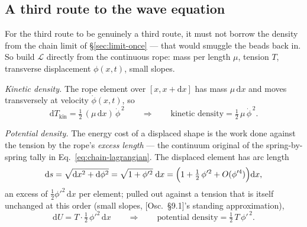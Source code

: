 \documentclass[11pt]{article}
\theoremstyle{plain}
\theoremstyle{definition}
\theoremstyle{remark}
\newcommand{\dd}{\mathrm{d}}
\begin{document}
\subsection{A third route to the wave equation}
\label{sec:wave-third-time}

For the third route to be genuinely a third route, it must not borrow
the density from the chain limit of \S\ref{sec:limit-once} --- that
would smuggle the beads back in. So build $\mathcal L$ directly from
the continuous rope: mass per length $\mu$, tension $T$, transverse
displacement $\phi(x, t)$, small slopes.

\emph{Kinetic density.} The rope element over $[x, x + \dd x]$ has
mass $\mu\,\dd x$ and moves transversely at velocity
$\dot\phi(x, t)$, so
\begin{equation}
  \dd T_{\text{kin}}
  = \tfrac12\,(\mu\,\dd x)\,\dot\phi^{\,2}
  \qquad\Longrightarrow\qquad
  \text{kinetic density} = \tfrac12\,\mu\,\dot\phi^{\,2} .
\end{equation}

\emph{Potential density.} The energy cost of a displaced shape is the
work done against the tension by the rope's \emph{excess length} ---
the continuum original of the spring-by-spring tally in
Eq.~\eqref{eq:chain-lagrangian}. The displaced element has arc length
\begin{equation}
  \dd s
  = \sqrt{\dd x^2 + \dd\phi^2}
  = \sqrt{1 + \phi'^2}\;\dd x
  = \Bigl(1 + \tfrac12\,\phi'^2 + O(\phi'^4)\Bigr)\dd x,
\end{equation}
an excess of $\tfrac12\phi'^2\,\dd x$ per element; pulled out against
a tension that is itself unchanged at this order (small slopes,
[Osc.\ \S9.1]'s standing approximation),
\begin{equation}
  \dd U
  = T \cdot \tfrac12\,\phi'^2\,\dd x
  \qquad\Longrightarrow\qquad
  \text{potential density} = \tfrac12\,T\,\phi'^{\,2} .
\end{equation}
\end{document}
